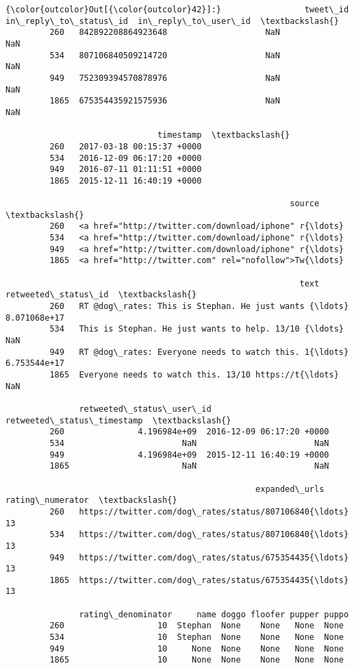 \documentclass[11pt]{article}
\begin{document}
\begin{Verbatim}[commandchars=\\\{\}]
{\color{outcolor}Out[{\color{outcolor}42}]:}                 tweet\_id  in\_reply\_to\_status\_id  in\_reply\_to\_user\_id  \textbackslash{}
         260   842892208864923648                    NaN                  NaN   
         534   807106840509214720                    NaN                  NaN   
         949   752309394570878976                    NaN                  NaN   
         1865  675354435921575936                    NaN                  NaN   
         
                               timestamp  \textbackslash{}
         260   2017-03-18 00:15:37 +0000   
         534   2016-12-09 06:17:20 +0000   
         949   2016-07-11 01:11:51 +0000   
         1865  2015-12-11 16:40:19 +0000   
         
                                                          source  \textbackslash{}
         260   <a href="http://twitter.com/download/iphone" r{\ldots}   
         534   <a href="http://twitter.com/download/iphone" r{\ldots}   
         949   <a href="http://twitter.com/download/iphone" r{\ldots}   
         1865  <a href="http://twitter.com" rel="nofollow">Tw{\ldots}   
         
                                                            text  retweeted\_status\_id  \textbackslash{}
         260   RT @dog\_rates: This is Stephan. He just wants {\ldots}         8.071068e+17   
         534   This is Stephan. He just wants to help. 13/10 {\ldots}                  NaN   
         949   RT @dog\_rates: Everyone needs to watch this. 1{\ldots}         6.753544e+17   
         1865  Everyone needs to watch this. 13/10 https://t{\ldots}                  NaN   
         
               retweeted\_status\_user\_id retweeted\_status\_timestamp  \textbackslash{}
         260               4.196984e+09  2016-12-09 06:17:20 +0000   
         534                        NaN                        NaN   
         949               4.196984e+09  2015-12-11 16:40:19 +0000   
         1865                       NaN                        NaN   
         
                                                   expanded\_urls  rating\_numerator  \textbackslash{}
         260   https://twitter.com/dog\_rates/status/807106840{\ldots}                13   
         534   https://twitter.com/dog\_rates/status/807106840{\ldots}                13   
         949   https://twitter.com/dog\_rates/status/675354435{\ldots}                13   
         1865  https://twitter.com/dog\_rates/status/675354435{\ldots}                13   
         
               rating\_denominator     name doggo floofer pupper puppo  
         260                   10  Stephan  None    None   None  None  
         534                   10  Stephan  None    None   None  None  
         949                   10     None  None    None   None  None  
         1865                  10     None  None    None   None  None  
\end{Verbatim}
            
\end{document}
